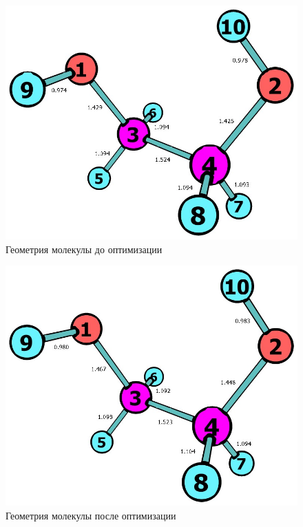 \begin{figure}[H]
\centering
\captionsetup{justification=centering}
\includegraphics[scale=0.4]{fig/2.jpg}
\caption{Геометрия молекулы до оптимизации}
\end{figure}

\begin{figure}[H]
\centering
\captionsetup{justification=centering}
\includegraphics[scale=0.4]{fig/3.jpg}
\caption{Геометрия молекулы после оптимизации}
\end{figure}


